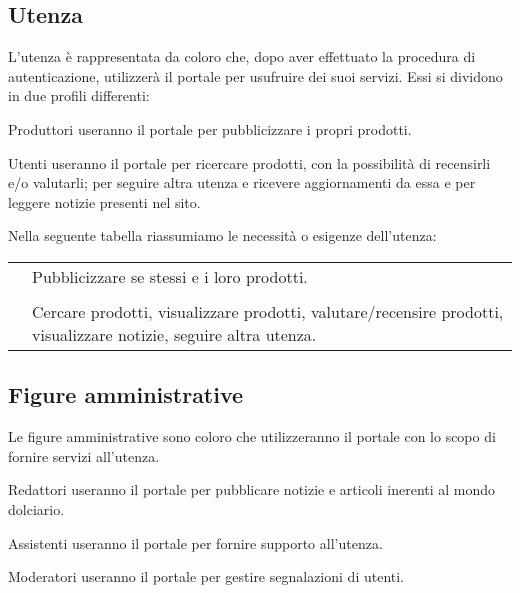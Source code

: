 \subsection{Utenza}
\label{sub:utenza}
L'utenza è rappresentata da coloro che, dopo aver effettuato la procedura di autenticazione, utilizzerà il portale per usufruire dei suoi servizi. Essi si dividono in due profili differenti:
\begin{descriptionInd}
    \item[Produttori] useranno il portale per pubblicizzare i propri prodotti.

    \item[Utenti] useranno il portale per ricercare prodotti, con la possibilità di recensirli e/o valutarli; per seguire altra utenza e ricevere aggiornamenti da essa e per leggere notizie presenti nel sito.
\end{descriptionInd}

\noindent
Nella seguente tabella riassumiamo le necessità o esigenze dell'utenza:
\begin{center}
	\begin{tabularx}{0.8\textwidth}{l X}
	\toprule 
		\tabhead{Figura} & \tabhead{Necessità o Esigenze} \\
	\midrule
		\ruolo{Produttori} & Pubblicizzare se stessi e i loro prodotti.  \\ \\
		\ruolo{Utenti} & Cercare prodotti, visualizzare prodotti, valutare/recensire prodotti, visualizzare notizie, seguire altra utenza. \\
	\bottomrule
	\end{tabularx}
\end{center}


\subsection{Figure amministrative}
\label{sub:figureamministrative}
Le figure amministrative sono coloro che utilizzeranno il portale con lo scopo di fornire servizi all'utenza.
\begin{descriptionInd}
    \item[Redattori] useranno il portale per pubblicare notizie e articoli inerenti al mondo dolciario.   
    \item[Assistenti] useranno il portale per fornire supporto all'utenza.
    \item[Moderatori] useranno il portale per gestire segnalazioni di utenti.
\end{descriptionInd}

